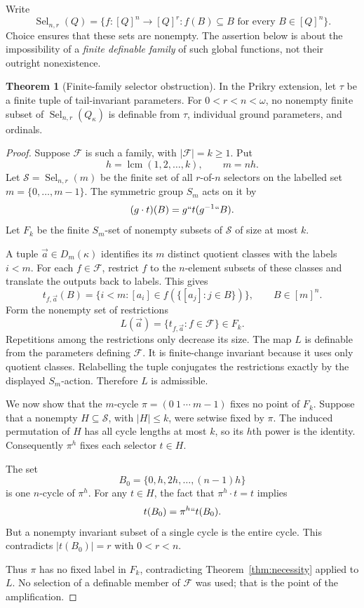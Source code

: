 \documentclass[11pt,letterpaper]{article}
\theoremstyle{definition}
\newtheorem{theorem}[definition]{Theorem}
\numberwithin{equation}{section}
\newcommand{\Sel}{\operatorname{Sel}}
\newcommand{\lcm}{\operatorname{lcm}}
\begin{document}
Write
\[
 \Sel_{n,r}(Q)=\{f:[Q]^n\to[Q]^r:
                  f(B)\subseteq B\text{ for every }B\in[Q]^n\}.
\]
Choice ensures that these sets are nonempty. The assertion below is about the impossibility of a \emph{finite definable family} of such global functions, not their outright nonexistence.

\begin{theorem}[Finite-family selector obstruction]\label{thm:selectors}
In the Prikry extension, let $\tau$ be a finite tuple of tail-invariant parameters. For $0<r<n<\omega$, no nonempty finite subset of $\Sel_{n,r}(Q_\kappa)$ is definable from $\tau$, individual ground parameters, and ordinals.
\end{theorem}
\begin{proof}
Suppose $\mathcal F$ is such a family, with $|\mathcal F|=k\geq1$. Put
\[
 h=\lcm(1,2,\ldots,k),\qquad m=nh.
\]
Let $\mathscr S=\Sel_{n,r}(m)$ be the finite set of all $r$-of-$n$ selectors on the labelled set $m=\{0,\ldots,m-1\}$. The symmetric group $S_m$ acts on it by
\[
 (g\cdot t)(B)=g``t(g^{-1}``B).
\]
Let $F_k$ be the finite $S_m$-set of nonempty subsets of $\mathscr S$ of size at most $k$.

A tuple $\vec a\in D_m(\kappa)$ identifies its $m$ distinct quotient classes with the labels $i<m$. For each $f\in\mathcal F$, restrict $f$ to the $n$-element subsets of these classes and translate the outputs back to labels. This gives
\[
 t_{f,\vec a}(B)=\{i<m:[a_i]\in f(\{[a_j]:j\in B\})\},
 \qquad B\in[m]^n.
\]
Form the nonempty set of restrictions
\[
 L(\vec a)=\{t_{f,\vec a}:f\in\mathcal F\}\in F_k.
\]
Repetitions among the restrictions only decrease its size. The map $L$ is definable from the parameters defining $\mathcal F$. It is finite-change invariant because it uses only quotient classes. Relabelling the tuple conjugates the restrictions exactly by the displayed $S_m$-action. Therefore $L$ is admissible.

We now show that the $m$-cycle $\pi=(0\ 1\ \cdots\ m-1)$ fixes no point of $F_k$. Suppose that a nonempty $H\subseteq\mathscr S$, with $|H|\leq k$, were setwise fixed by $\pi$. The induced permutation of $H$ has all cycle lengths at most $k$, so its $h$th power is the identity. Consequently $\pi^h$ fixes each selector $t\in H$.

The set
\[
 B_0=\{0,h,2h,\ldots,(n-1)h\}
\]
is one $n$-cycle of $\pi^h$. For any $t\in H$, the fact that $\pi^h\cdot t=t$ implies
\[
 t(B_0)=\pi^h``t(B_0).
\]
But a nonempty invariant subset of a single cycle is the entire cycle. This contradicts $|t(B_0)|=r$ with $0<r<n$.

Thus $\pi$ has no fixed label in $F_k$, contradicting Theorem~\ref{thm:necessity} applied to $L$. No selection of a definable member of $\mathcal F$ was used; that is the point of the amplification.
\end{proof}
\end{document}
